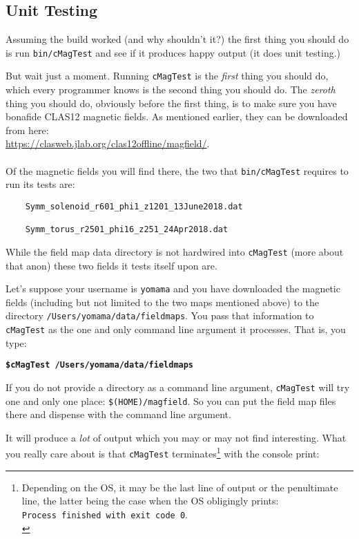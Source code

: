 \documentclass{article}
\begin{document}
\subsection {Unit Testing}
Assuming the build worked (and why shouldn't it?) the first thing you should do is run \texttt{bin/cMagTest} and see if it produces happy output (it does unit testing.) 

But wait just a moment. Running  \texttt{cMagTest} is the \textit{first} thing you should do, which every programmer knows is the second thing you should do. The \textit{zeroth} thing you should do, obviously before the first thing, is to make sure you have bonafide CLAS12 magnetic fields.  As mentioned earlier, they can be downloaded from here:\\

 \url{https://clasweb.jlab.org/clas12offline/magfield/}.\\
\vspace{1mm}\\
Of the magnetic fields you will find there, the two that \texttt{bin/cMagTest}  requires to run its tests are:\\

\begin{verbatim}
    Symm_solenoid_r601_phi1_z1201_13June2018.dat

    Symm_torus_r2501_phi16_z251_24Apr2018.dat
\end{verbatim} 
\vspace{1.5mm}

While the field map data directory is not hardwired into \texttt{cMagTest} (more about that anon) these two fields it tests itself upon are. 

Let's suppose your username is \texttt{yomama} and you have downloaded the magnetic fields (including but not limited to the two maps mentioned above) to the directory \texttt{/Users/yomama/data/fieldmaps}. You pass that information to \texttt{cMagTest} as the one and only command line argument it processes. That is, you type:

\textbf{\texttt{\$cMagTest /Users/yomama/data/fieldmaps}}

If you do not provide a directory as a command line argument, \texttt{cMagTest} will try one and only one place: \texttt{\$(HOME)/magfield}. So you can put the field map files there and dispense with the command line argument.

It will produce a \textit{lot} of output which you may or may not find interesting.  What you really care about is that \texttt{cMagTest} terminates\footnote{Depending on the OS, it may be the last line of output or the penultimate line, the latter being the case when the OS obligingly prints:\\ \texttt{Process finished with exit code 0}.\\} with the console print: 
\end{document}
